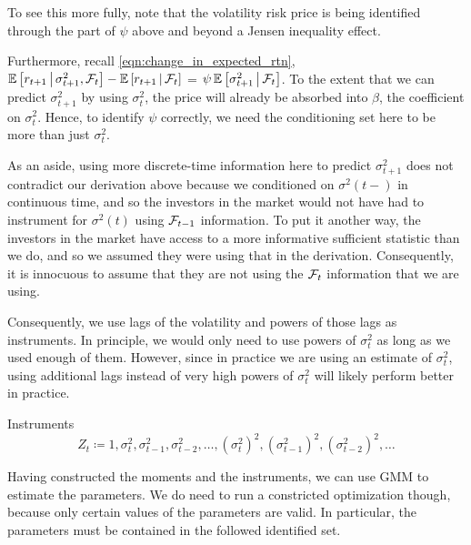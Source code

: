\documentclass[11pt, letterpaper, twoside, final]{article}
\begin{document}
To see this more fully, note that the volatility risk price is being identified through the part of $\psi$ above
and beyond a Jensen inequality effect.

Furthermore, recall \cref{eqn:change_in_expected_rtn},  $\operatorname{\mathbb{E}}\left[r_{t+1} \,\middle\vert\, \sigma^2_{t+1}, \mathcal{F}_{t}\right]  -
\operatorname{\mathbb{E}}\left[ r_{t+1} \,\middle\vert\, \mathcal{F}_t\right]$ = $\psi \operatorname{\mathbb{E}}\left[\sigma^2_{t+1} \,\middle\vert\, \mathcal{F}_t\right]$.
To the extent that we can predict $\sigma^2_{t+1}$ by using $\sigma^2_t$, the price will already be absorbed into
$\beta$, the coefficient on $\sigma^2_t$.
Hence, to identify $\psi$ correctly, we need the conditioning set here to be more than just $\sigma^2_t$.


As an aside, using more discrete-time information here to predict $\sigma^2_{t+1}$ does not contradict our
derivation above because we conditioned on $\sigma^2(t-)$ in continuous time, and so the investors in the market
would not have had to instrument for $\sigma^2(t)$ using $\mathcal{F}_{t-1}$ information.
To put it another way, the investors in the market have access to a more informative sufficient statistic than we
do, and so we assumed they were using that in the derivation.
Consequently, it is innocuous to assume that they are not using the $\mathcal{F}_{t}$ information that we are using.

Consequently, we use lags of the volatility and powers of those lags as instruments.
In principle, we would only need to use powers of $\sigma^2_t$ as long as we used enough of them.
However, since in practice we are using an estimate of $\sigma^2_t$, using additional lags instead of very high
powers of $\sigma^2_t$ will likely perform better in practice.


\begin{defn}{Instruments}
    \label{defn:instruments}
    \begin{equation}
        Z_t \coloneqq 1, \sigma^2_{t}, \sigma^2_{t-1}, \sigma^2_{t-2}, \ldots, (\sigma^2_{t})^2,
        (\sigma^2_{t-1})^2, (\sigma^2_{t-2})^2, \ldots
    \end{equation}
\end{defn}

Having constructed the moments and the instruments, we can use GMM to estimate the parameters.
We do need to run a constricted optimization though, because only certain values of the parameters are valid. 
In particular, the parameters must be contained in the followed identified set.
\end{document}
